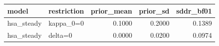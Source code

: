 \begin{tabular}{llrrr}
\toprule
model & restriction & prior\_mean & prior\_sd & sddr\_bf01 \\
\midrule
hsa\_steady & kappa\_0=0 & 0.1000 & 0.2000 & 0.1389 \\
hsa\_steady & delta=0 & 0.0000 & 0.0200 & 0.0974 \\
\bottomrule
\end{tabular}
